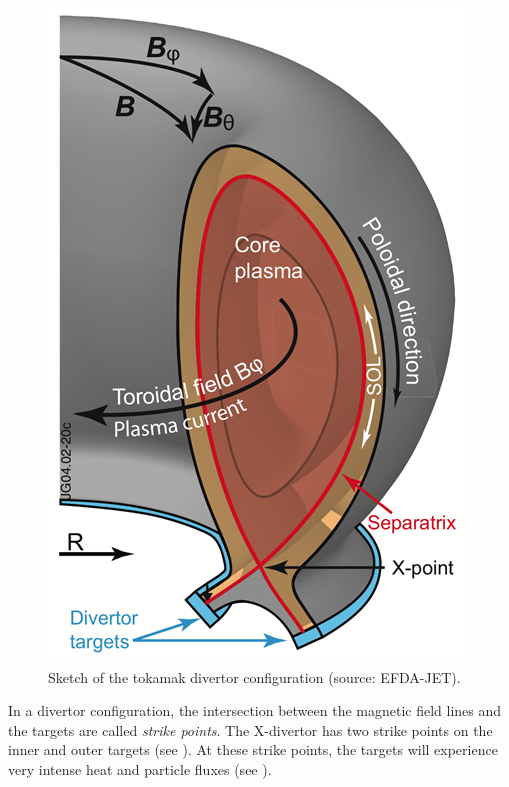 \begin{figure} [h]
    \centering
    \includegraphics[width=0.5\linewidth]{Figures/Chapter1/sketch_divertor.png}
    \caption{Sketch of the tokamak divertor configuration (source: EFDA-JET).}
\end{figure}

In a \gls{divertor} configuration, the intersection between the magnetic field lines and the targets are called \emph{\glspl{strike point}}.
The X-divertor has two \glspl{strike point} on the inner and outer targets (see ).
At these \glspl{strike point}, the targets will experience very intense heat and particle fluxes (see ).

